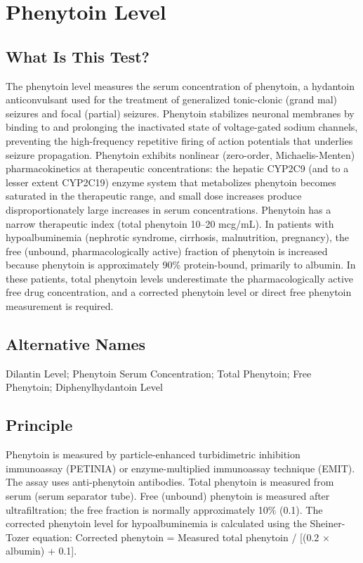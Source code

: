 \chapter{Phenytoin Level}

\section*{What Is This Test?}
The phenytoin level measures the serum concentration of phenytoin, a hydantoin anticonvulsant used for the treatment of generalized tonic-clonic (grand mal) seizures and focal (partial) seizures. Phenytoin stabilizes neuronal membranes by binding to and prolonging the inactivated state of voltage-gated sodium channels, preventing the high-frequency repetitive firing of action potentials that underlies seizure propagation. Phenytoin exhibits nonlinear (zero-order, Michaelis-Menten) pharmacokinetics at therapeutic concentrations: the hepatic CYP2C9 (and to a lesser extent CYP2C19) enzyme system that metabolizes phenytoin becomes saturated in the therapeutic range, and small dose increases produce disproportionately large increases in serum concentrations. Phenytoin has a narrow therapeutic index (total phenytoin 10--20 mcg/mL). In patients with hypoalbuminemia (nephrotic syndrome, cirrhosis, malnutrition, pregnancy), the free (unbound, pharmacologically active) fraction of phenytoin is increased because phenytoin is approximately 90\% protein-bound, primarily to albumin. In these patients, total phenytoin levels underestimate the pharmacologically active free drug concentration, and a corrected phenytoin level or direct free phenytoin measurement is required.

\section*{Alternative Names}
Dilantin Level; Phenytoin Serum Concentration; Total Phenytoin; Free Phenytoin; Diphenylhydantoin Level

\section*{Principle}
Phenytoin is measured by particle-enhanced turbidimetric inhibition immunoassay (PETINIA) or enzyme-multiplied immunoassay technique (EMIT). The assay uses anti-phenytoin antibodies. Total phenytoin is measured from serum (serum separator tube). Free (unbound) phenytoin is measured after ultrafiltration; the free fraction is normally approximately 10\% (0.1). The corrected phenytoin level for hypoalbuminemia is calculated using the Sheiner-Tozer equation: Corrected phenytoin = Measured total phenytoin / [(0.2 $\times$ albumin) + 0.1].

